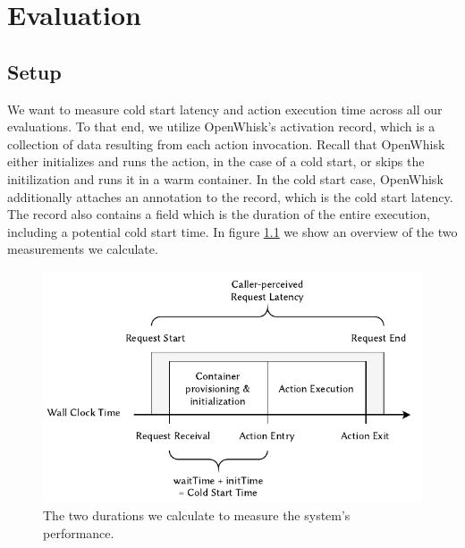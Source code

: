 \chapter{Evaluation}
\label{chapter:evaluation}

\section{Setup}

We want to measure cold start latency and action execution time across all our evaluations. To that end, we utilize OpenWhisk's activation record, which is a collection of data resulting from each action invocation.  Recall that OpenWhisk either initializes and runs the action, in the case of a cold start, or skips the initilization and runs it in a warm container. In the cold start case, OpenWhisk additionally attaches an  annotation to the record, which is the cold start latency. The record also contains a  field which is the duration of the entire execution, including a potential cold start time. In figure \ref{fig:evaluation-time-measurement} we show an overview of the two measurements we calculate.

\begin{figure}
    \begin{center}
        \includegraphics{figures/EvaluationTimeMeasurement.pdf}
    \end{center}
    \caption{The two durations we calculate to measure the system's performance.}
    \label{fig:evaluation-time-measurement}
\end{figure}



